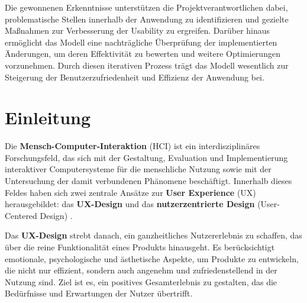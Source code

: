 \documentclass[12pt,oneside]{article}
\begin{document}
Die gewonnenen Erkenntnisse unterstützen die Projektverantwortlichen dabei, problematische Stellen innerhalb der Anwendung zu identifizieren und gezielte Maßnahmen zur Verbesserung der Usability zu ergreifen. Darüber hinaus ermöglicht das Modell eine nachträgliche Überprüfung der implementierten Änderungen, um deren Effektivität zu bewerten und weitere Optimierungen vorzunehmen. Durch diesen iterativen Prozess trägt das Modell wesentlich zur Steigerung der Benutzerzufriedenheit und Effizienz der Anwendung bei.

\renewcommand{\contentsname}{Inhaltsverzeichnis}

\tableofcontents
{} %

 
  
\begin{acronym}[hyperlinks]
\end{acronym}

\section{Einleitung}

Die \textbf{Mensch-Computer-Interaktion} (HCI) ist ein interdisziplinäres Forschungsfeld, das sich mit der Gestaltung, Evaluation und Implementierung interaktiver Computersysteme für die menschliche Nutzung sowie mit der Untersuchung der damit verbundenen Phänomene beschäftigt. Innerhalb dieses Feldes haben sich zwei zentrale Ansätze zur \textbf{User Experience} (UX) herausgebildet: das \textbf{UX-Design} und das \textbf{nutzerzentrierte Design} (User-Centered Design) \cite{glanznig}.

Das \textbf{UX-Design} strebt danach, ein ganzheitliches Nutzererlebnis zu schaffen, das über die reine Funktionalität eines Produkts hinausgeht. Es berücksichtigt emotionale, psychologische und ästhetische Aspekte, um Produkte zu entwickeln, die nicht nur effizient, sondern auch angenehm und zufriedenstellend in der Nutzung sind. Ziel ist es, ein positives Gesamterlebnis zu gestalten, das die Bedürfnisse und Erwartungen der Nutzer übertrifft.
\end{document}
